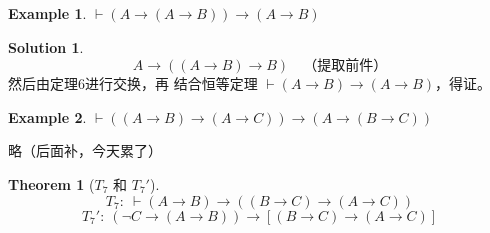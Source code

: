 \documentclass[oneside]{book}
\theoremstyle{definition}
\newtheorem{example}{Example}[section]
\newtheorem{theorem}{Theorem}[section]
\newtheorem*{sol}{Solution}
\begin{document}
\begin{example}
$\vdash (A \to (A \to B)) \to (A \to B)$
\end{example}
\begin{sol}
\[
A \to \left((A \to B) \to B\right) \quad \text{（提取前件）}
\]
然后由定理6进行交换，再
结合恒等定理 $\vdash (A \to B) \to (A \to B)$，得证。
\end{sol}
\begin{example}
	$\vdash ((A \to B) \to (A \to C)) \to (A \to (B \to C))$
\end{example}
略（后面补，今天累了）
\begin{theorem}[\(T_7\) 和 \(T_7'\)]
	\[
	T_7:\ \vdash (A \to B) \to ((B \to C) \to (A \to C))
	\]
	\[
	T_7':\ (\neg C \to (A \to B)) \to [(B \to C) \to (A \to C)]
	\]
	
\end{theorem}
\end{document}
